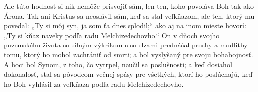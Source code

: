 Ale túto hodnosť si nik nemôže prisvojiť sám, len ten, koho povoláva Boh tak ako Árona.
Tak ani Kristus sa neoslávil sám, keď sa stal veľkňazom, ale ten, ktorý mu povedal:
„Ty si môj syn,
ja som ťa dnes splodil;“
ako aj na inom mieste hovorí:
„Ty si kňaz naveky podľa radu Melchizedechovho.“
On v dňoch svojho pozemského života so silným výkrikom a so slzami prednášal prosby a modlitby tomu, ktorý ho mohol zachrániť od smrti; a bol vyslyšaný pre svoju bohabojnosť.
A hoci bol Synom, z toho, čo vytrpel, naučil sa poslušnosti;
a keď dosiahol dokonalosť, stal sa pôvodcom večnej spásy pre všetkých, ktorí ho poslúchajú, keď ho Boh vyhlásil za veľkňaza podľa radu Melchizedechovho. 